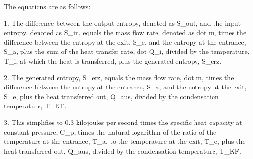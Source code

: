 The equations are as follows:

1. The difference between the output entropy, denoted as S_out, and the input entropy, denoted as S_in, equals the mass flow rate, denoted as dot m, times the difference between the entropy at the exit, S_e, and the entropy at the entrance, S_a, plus the sum of the heat transfer rate, dot Q_i, divided by the temperature, T_i, at which the heat is transferred, plus the generated entropy, S_erz.

2. The generated entropy, S_erz, equals the mass flow rate, dot m, times the difference between the entropy at the entrance, S_a, and the entropy at the exit, S_e, plus the heat transferred out, Q_aus, divided by the condensation temperature, T_KF.

3. This simplifies to 0.3 kilojoules per second times the specific heat capacity at constant pressure, C_p, times the natural logarithm of the ratio of the temperature at the entrance, T_a, to the temperature at the exit, T_e, plus the heat transferred out, Q_aus, divided by the condensation temperature, T_KF.